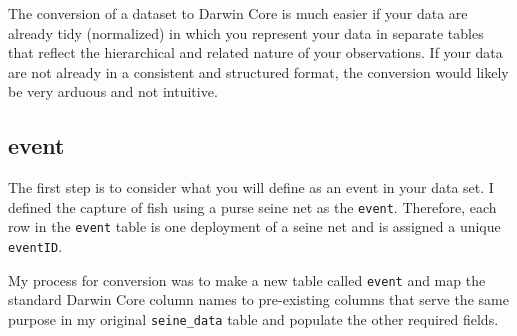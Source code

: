 \documentclass[
]{book}
\begin{document}
The conversion of a dataset to Darwin Core is much easier if your data are already tidy (normalized) in which you represent your data in separate tables that reflect the hierarchical and related nature of your observations. If your data are not already in a consistent and structured format, the conversion would likely be very arduous and not intuitive.

\hypertarget{event}{%
\subsection{event}\label{event}}

The first step is to consider what you will define as an event in your data set. I defined the capture of fish using a purse seine net as the \texttt{event}. Therefore, each row in the \texttt{event} table is one deployment of a seine net and is assigned a unique \texttt{eventID}.

My process for conversion was to make a new table called \texttt{event} and map the standard Darwin Core column names to pre-existing columns that serve the same purpose in my original \texttt{seine\_data} table and populate the other required fields.
\end{document}

